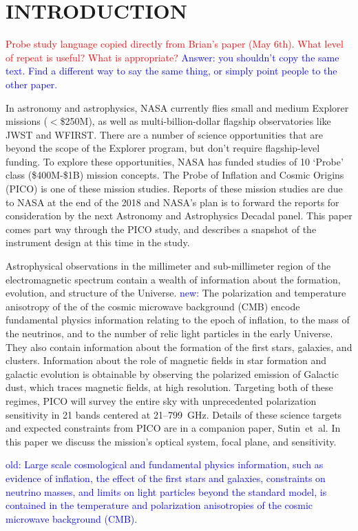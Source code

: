 \documentclass[]{spie}  %
\newcommand{\comr}[1]{\textcolor{red}{#1}}
\newcommand{\comb}[1]{\textcolor{blue}{#1}}
\begin{document}
\section{INTRODUCTION}
\label{sec:intro}  

\comr{Probe study language copied directly from Brian's paper (May 6th).  What level of repeat is useful?  What is appropriate?}
\comb{Answer: you shouldn't copy the same text. Find a different way to say the same thing, or simply point people to the other paper.} 

In astronomy and astrophysics, NASA currently flies small and medium Explorer missions ($<$\$250M), as well as multi-billion-dollar flagship observatories like JWST and WFIRST. There are a number of science opportunities that are beyond the scope of the Explorer program, but don't require flagship-level funding. To explore these opportunities, NASA has funded studies of 10 `Probe' class (\$400M-\$1B) mission concepts. The Probe of Inflation and Cosmic Origins (PICO) is one of these mission studies. Reports of these mission studies are due to NASA at the end of the 2018 and NASA's plan is to forward the reports for consideration by the next Astronomy and Astrophysics Decadal panel. This paper comes part way through the PICO study, and describes a snapshot of the  instrument design at this time in the study.

Astrophysical observations in the  millimeter and sub-millimeter region of the electromagnetic spectrum contain a wealth of 
information about the formation, evolution, and structure of the Universe.  
\comb{new:} The polarization and temperature anisotropy of the of the cosmic microwave 
background (CMB) encode fundamental physics information relating to  the epoch of inflation, to the mass of the neutrinos,  
and to the number of relic light particles in the early Universe. They also contain information about the formation of 
the first stars, galaxies, and clusters.  Information about the role of magnetic fields in star formation and galactic evolution is obtainable 
by observing the polarized emission of Galactic dust, which 
traces magnetic fields, at high resolution. Targeting both of these regimes, PICO will survey the entire sky with 
unprecedented polarization sensitivity 
in 21 bands centered at 21--799~GHz.  Details of these science targets and expected constraints from PICO 
are in a companion paper, Sutin~et~al.\cite{brian_spie} 
In this paper we discuss the mission's optical system, focal plane, and sensitivity.


\comb{old: Large scale cosmological and fundamental 
physics information, such as 
evidence of inflation, the effect of the first stars and galaxies, constraints on neutrino masses, and limits on light particles beyond 
the standard model, is contained in the temperature and polarization anisotropies of the cosmic microwave 
background (CMB). } 
\end{document}
